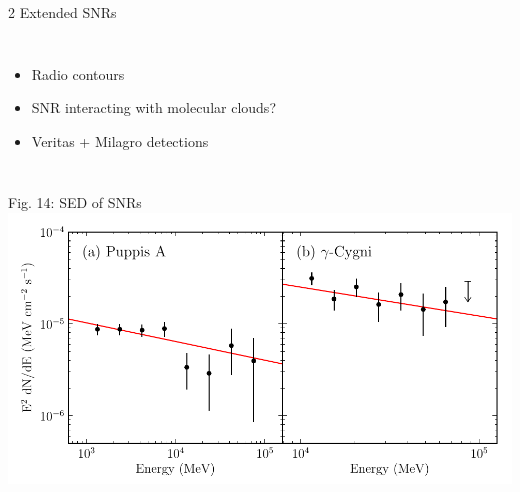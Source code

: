 \documentclass[12pt]{beamer}
\begin{document}
\begin{frame}{2 Extended SNRs}
\begin{columns}
    \begin{itemize}
      \item Radio contours
      \item SNR interacting with molecular clouds?
      \item Veritas + Milagro detections
      \end{itemize}
  \end{columns}
\end{frame}

\begin{frame}{Fig. 14: SED of SNRs}
  \includegraphics[scale=0.5]{plots/snr_seds_color.pdf}
\end{frame}
\end{document}
